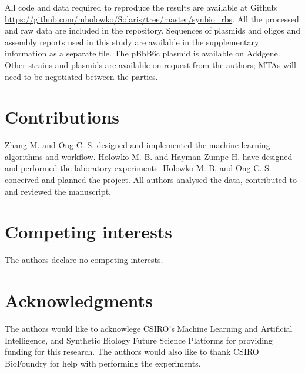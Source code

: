 \documentclass{article}
\begin{document}
All code and data required to reproduce the results are available at Github: \url{https://github.com/mholowko/Solaris/tree/master/synbio_rbs}.
All the processed and raw data are included in the repository.
Sequences of plasmids and oligos and assembly reports used in this study are available in the supplementary information as a separate file.
The pBbB6c plasmid is available on Addgene. Other strains and plasmids are available on request from the authors; MTAs will need to be negotiated between the parties.


\section*{Contributions}
Zhang M. and Ong C. S. designed and implemented the machine learning algorithms and workflow. Holowko M. B. and Hayman Zumpe H. have designed and performed the laboratory experiments. Holowko M. B. and Ong C. S. conceived and planned the project. All authors analysed the data, contributed to and reviewed the manuscript.

\section*{Competing interests}
The authors declare no competing interests.

\section*{Acknowledgments}
The authors would like to acknowlege CSIRO's Machine Learning and Artificial Intelligence, and Synthetic Biology Future Science Platforms for providing funding for this research. The authors would also like to thank CSIRO BioFoundry for help with performing the experiments.


\newpage

\printbibliography

\clearpage

\setcounter{figure}{0}
\makeatletter
\renewcommand{\thefigure}{S\@arabic\c@figure}
\makeatother
\appendix

\end{document}
